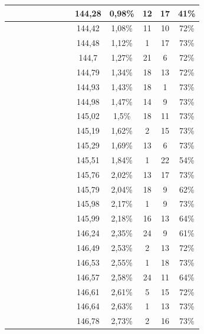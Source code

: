 \begin{center}
\begin{longtable}{|c|c|c|c|c|c|c|c|c|c|c|c|c|}
 \x &  &  &  &  &  &  &  \x & 144,28 & 0,98\% & 12 & 17 & 41\% \\ \hline
 \x &  &  \x &  &  \x &  \x &  &  \x & 144,42 & 1,08\% & 11 & 10 & 72\% \\ \hline
 \x &  \x &  &  \x &  \x &  \x &  &  \x & 144,48 & 1,12\% & 1 & 17 & 73\% \\ \hline
 \x &  &  \x &  \x &  &  \x &  &  \x & 144,7 & 1,27\% & 21 & 6 & 72\% \\ \hline
 \x &  \x &  \x &  \x &  &  \x &  &  \x & 144,79 & 1,34\% & 18 & 13 & 72\% \\ \hline
 \x &  &  &  &  &  \x &  &  \x & 144,93 & 1,43\% & 18 & 1 & 73\% \\ \hline
 \x &  &  \x &  \x &  \x &  \x &  \x &  \x & 144,98 & 1,47\% & 14 & 9 & 73\% \\ \hline
 \x &  &  \x &  \x &  &  \x &  \x &  \x & 145,02 & 1,5\% & 18 & 11 & 73\% \\ \hline
 \x &  \x &  \x &  \x &  &  \x &  \x &  \x & 145,19 & 1,62\% & 2 & 15 & 73\% \\ \hline
 \x &  &  &  \x &  &  \x &  \x &  \x & 145,29 & 1,69\% & 13 & 6 & 73\% \\ \hline
 \x &  \x &  &  &  &  &  &  \x & 145,51 & 1,84\% & 1 & 22 & 54\% \\ \hline
 \x &  &  \x &  &  \x &  \x &  &  \x & 145,76 & 2,02\% & 13 & 17 & 73\% \\ \hline
 \x &  \x &  \x &  &  \x &  &  &  \x & 145,79 & 2,04\% & 18 & 9 & 62\% \\ \hline
 \x &  \x &  \x &  &  \x &  \x &  \x &  \x & 145,98 & 2,17\% & 1 & 9 & 73\% \\ \hline
 \x &  &  \x &  &  &  &  &  \x & 145,99 & 2,18\% & 16 & 13 & 64\% \\ \hline
 \x &  &  &  &  \x &  &  &  \x & 146,24 & 2,35\% & 24 & 9 & 61\% \\ \hline
 \x &  \x &  \x &  &  \x &  \x &  &  \x & 146,49 & 2,53\% & 2 & 13 & 72\% \\ \hline
 \x &  &  \x &  &  &  \x &  &  \x & 146,53 & 2,55\% & 1 & 18 & 73\% \\ \hline
 \x &  \x &  \x &  &  &  &  &  \x & 146,57 & 2,58\% & 24 & 11 & 64\% \\ \hline
 \x &  \x &  \x &  &  \x &  \x &  \x &  \x & 146,61 & 2,61\% & 5 & 15 & 72\% \\ \hline
 \x &  \x &  &  \x &  \x &  \x &  \x &  \x & 146,64 & 2,63\% & 1 & 13 & 73\% \\ \hline
 \x &  \x &  \x &  \x &  \x &  \x &  \x &  \x & 146,78 & 2,73\% & 2 & 16 & 73\% \\ \hline

\end{longtable}
\end{center}
